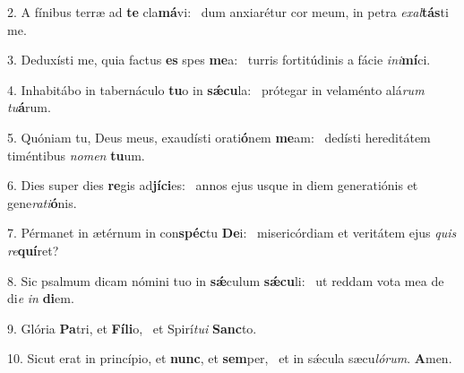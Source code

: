 2. A fínibus terræ ad \textbf{te} cla\textbf{má}vi: \ast\  dum anxiarétur cor meum, in petra \textit{ex}\textit{al}\textbf{tás}ti me.\

3. Deduxísti me, quia factus \textbf{es} spes \textbf{me}a: \ast\  turris fortitúdinis a fácie \textit{in}\textit{i}\textbf{mí}ci.\

4. Inhabitábo in tabernáculo \textbf{tu}o in \textbf{sǽ}\textbf{cu}la: \ast\  prótegar in velaménto alá\textit{rum} \textit{tu}\textbf{á}rum.\

5. Quóniam tu, Deus meus, exaudísti orati\textbf{ó}nem \textbf{me}am: \ast\  dedísti hereditátem timéntibus \textit{no}\textit{men} \textbf{tu}um.\

6. Dies super dies \textbf{re}gis ad\textbf{jí}\textbf{ci}es: \ast\  annos ejus usque in diem generatiónis et gene\textit{ra}\textit{ti}\textbf{ó}nis.\

7. Pérmanet in ætérnum in con\textbf{spéc}tu \textbf{De}i: \ast\  misericórdiam et veritátem ejus \textit{quis} \textit{re}\textbf{quí}ret?\

8. Sic psalmum dicam nómini tuo in \textbf{sǽ}culum \textbf{sǽ}\textbf{cu}li: \ast\  ut reddam vota mea de di\textit{e} \textit{in} \textbf{di}em.\

9. Glória \textbf{Pa}tri, et \textbf{Fí}\textbf{li}o, \ast\  et Spirí\textit{tu}\textit{i} \textbf{Sanc}to.\

10. Sicut erat in princípio, et \textbf{nunc}, et \textbf{sem}per, \ast\  et in sǽcula sæcu\textit{ló}\textit{rum}. \textbf{A}men.\

